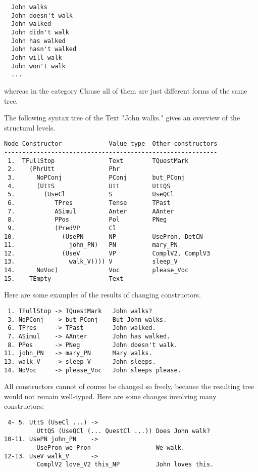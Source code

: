 \documentclass[11pt,a4paper]{article}
\begin{document}
\begin{verbatim}
  John walks
  John doesn't walk
  John walked
  John didn't walk
  John has walked
  John hasn't walked
  John will walk
  John won't walk
  ...
\end{verbatim}
whereas in the category Clause all of them are just different forms of
the same tree.

The following syntax tree of the Text "John walks." gives an overview
of the structural levels.

\begin{verbatim}
Node Constructor             Value type  Other constructors
-----------------------------------------------------------
 1.  TFullStop               Text        TQuestMark
 2.    (PhrUtt               Phr             
 3.      NoPConj             PConj       but_PConj
 4.      (UttS               Utt         UttQS
 5.        (UseCl            S           UseQCl
 6.           TPres          Tense       TPast
 7.           ASimul         Anter       AAnter
 8.           PPos           Pol         PNeg
 9.           (PredVP        Cl              
10.             (UsePN       NP          UsePron, DetCN
11.               john_PN)   PN          mary_PN
12.             (UseV        VP          ComplV2, ComplV3
13.               walk_V)))) V           sleep_V
14.      NoVoc)              Voc         please_Voc
15.    TEmpty                Text            
\end{verbatim}
Here are some examples of the results of changing constructors.

\begin{verbatim}
 1. TFullStop -> TQuestMark   John walks?
 3. NoPConj   -> but_PConj    But John walks.
 6. TPres     -> TPast        John walked.
 7. ASimul    -> AAnter       John has walked.
 8. PPos      -> PNeg         John doesn't walk.
11. john_PN   -> mary_PN      Mary walks.
13. walk_V    -> sleep_V      John sleeps.
14. NoVoc     -> please_Voc   John sleeps please.
\end{verbatim}
All constructors cannot of course be changed so freely, because the
resulting tree would not remain well-typed. Here are some changes involving
many constructors:

\begin{verbatim}
 4- 5. UttS (UseCl ...) -> 
         UttQS (UseQCl (... QuestCl ...)) Does John walk?
10-11. UsePN john_PN    -> 
         UsePron we_Pron                  We walk.
12-13. UseV walk_V      -> 
         ComplV2 love_V2 this_NP          John loves this. 
\end{verbatim}
\end{document}

